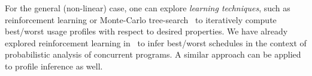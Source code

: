 For the general (non-linear) case, one can explore {\em learning
  techniques}, such as reinforcement learning or Monte-Carlo
tree-search~\cite{sutton1998reinforcement} to iteratively compute
best/worst usage profiles with respect to desired properties. We have
already explored reinforcement learning in~\cite{luckow2014exact} to
infer best/worst schedules in the context of probabilistic analysis of
concurrent programs. A similar approach can be applied to profile
inference as well. 


